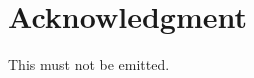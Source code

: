 \documentclass{article}
\begin{document}
\maketitle
\section*{Acknowledgment}
This must not be emitted.
\end{document}
